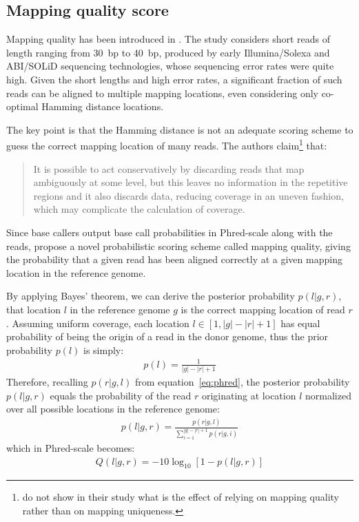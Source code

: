 \subsection{Mapping quality score}
\label{sub:mapqual}

Mapping quality has been introduced in \citep{Li2008}.
The study considers short reads of length ranging from 30~bp to 40~bp, produced by early Illumina/Solexa and ABI/SOLiD sequencing technologies, whose sequencing error rates were quite high.
Given the short lengths and high error rates, a significant fraction of such reads can be aligned to multiple mapping locations, even considering only co-optimal Hamming distance locations.

The key point is that the Hamming distance is not an adequate scoring scheme to guess the correct mapping location of many reads.
The authors claim\footnote{\citeauthor{Li2008} do not show in their study what is the effect of relying on mapping quality rather than on mapping uniqueness.} that:
\begin{quote}It is possible to act conservatively by discarding reads that map ambiguously at some level, but this leaves no information in the repetitive regions and it also discards data, reducing coverage in an uneven fashion, which may complicate the calculation of coverage.\end{quote}
Since base callers output base call probabilities in Phred-scale along with the reads, \citeauthor{Li2008} propose a novel probabilistic scoring scheme called mapping quality, giving the probability that a given read has been aligned correctly at a given mapping location in the reference genome.

By applying Bayes' theorem, we can derive the posterior probability $p(l|g,r)$, that location $l$ in the reference genome $g$ is the correct mapping location of read $r$.
Assuming uniform coverage, each location $l \in [1, |g| - |r| + 1]$ has equal probability of being the origin of a read in the donor genome, thus the prior probability $p(l)$ is simply:
\begin{eqnarray}
p(l) = \frac{1}{|g| - |r| + 1}
\end{eqnarray}
Therefore, recalling $p(r | g, l)$ from equation~\ref{eq:phred}, the posterior probability $p(l|g,r)$ equals the probability of the read $r$ originating at location $l$ normalized over all possible locations in the reference genome:
\begin{eqnarray}
\label{eq:mapprob}
p(l|g,r) = \frac{p(r|g,l)}{\sum_{i=1}^{|g| - |r| + 1}{p(r|g,i)}}
\end{eqnarray}
which in Phred-scale becomes:
\begin{eqnarray}
\label{eq:mapqual}
Q(l|g,r) = -10 \log_{10}[1 - p(l|g,r)]
\end{eqnarray}

